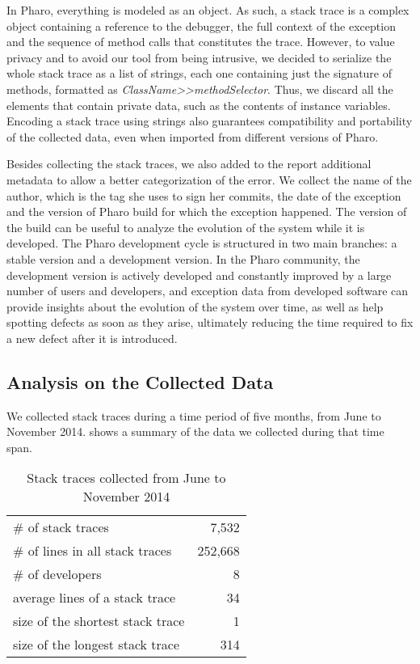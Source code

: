 In Pharo, everything is modeled as an object.
As such, a stack trace is a complex object containing a reference to the debugger, the full context of the exception and the sequence of method calls that constitutes the trace.
However, to value privacy and to avoid our tool from being intrusive, we decided to serialize the whole stack trace as a list of strings, each one containing just the signature of methods, formatted as \textit{ClassName{>}{>}methodSelector}.
Thus, we discard all the elements that contain private data, such as the contents of instance variables.
Encoding a stack trace using strings also guarantees compatibility and portability of the collected data, even when imported from different versions of Pharo.

Besides collecting the stack traces, we also added to the report additional metadata to allow a better categorization of the error.
We collect the name of the author, which is the tag she uses to sign her commits, the date of the exception and the version of Pharo build for which the exception happened.
The version of the build can be useful to analyze the evolution of the system while it is developed.
The Pharo development cycle is structured in two main branches: a stable version and a development version.
In the Pharo community, the development version is actively developed and constantly improved by a large number of users and developers, and exception data from developed software can provide insights about the evolution of the system over time, as well as help spotting defects as soon as they arise, ultimately reducing the time required to fix a new defect after it is introduced.

\subsection{Analysis on the Collected Data}

We collected stack traces during a time period of five months, from June to November 2014.
 shows a summary of the data we collected during that time span.

\begin{table}[h]
\caption{Stack traces collected from June to November 2014}
\begin{center}
\begin{tabular}{lr}
\# of stack traces & 7,532 \\
\# of lines in all stack traces & 252,668 \\
\# of developers & 8 \\
average lines of a stack trace & 34 \\
size of the shortest stack trace & 1 \\
size of the longest stack trace & 314 \\
\end{tabular}
\end{center}
\label{tab:data-summary}
\end{table}

